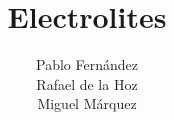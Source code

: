 \documentclass[12pt,a4paper,openright]{book} %
\date{}
\title{Electrolites}
\author{Pablo Fernández\\Rafael de la Hoz\\Miguel Márquez}
\begin{document}
\frontmatter
\pagestyle{fancy}

 {
 \fancyhf{}
 \fancyfoot[RO,LE]{\thepage}
 \renewcommand{\headrulewidth}{0.0pt}
 \renewcommand{\footrulewidth}{0.0pt}
}
%
\pagestyle{plain}
\fancyhf{}
\fancyfoot[RO,LE]{\thepage}
\renewcommand{\headrulewidth}{0.0pt}
\renewcommand{\footrulewidth}{0.0pt}


\tableofcontents
%
\pagestyle{plain}
\fancyhf{}
\fancyfoot[RO,LE]{\thepage}
\renewcommand{\headrulewidth}{0.0pt}
\renewcommand{\footrulewidth}{0.0pt}
\listoffigures
%
\pagestyle{plain}
\fancyhf{}
\fancyfoot[RO,LE]{\thepage}
\renewcommand{\headrulewidth}{0.0pt}
\renewcommand{\footrulewidth}{0.0pt}
\listoftables
\mainmatter
\pagestyle{fancy}
\renewcommand{\chaptermark}[1]{\markboth{#1}{}}
\renewcommand{\sectionmark}[1]{\markright{#1}{}}
\fancyfoot[RO,LE]{\thepage}
\fancyhead[LE]{{\it \leftmark}}
\fancyhead[RO]{{\it \rightmark}}
\fancyhead[RE]{}
\fancyhead[LO]{}
\cfoot{}
\renewcommand{\headrulewidth}{0.5pt}
\renewcommand{\footrulewidth}{0.5pt}



%
\appendix{}
%
\fancyhf{}
\fancyfoot[RO,LE]{\thepage}
\renewcommand{\headrulewidth}{0.0pt}
\renewcommand{\footrulewidth}{0.0pt}

\end{document}
